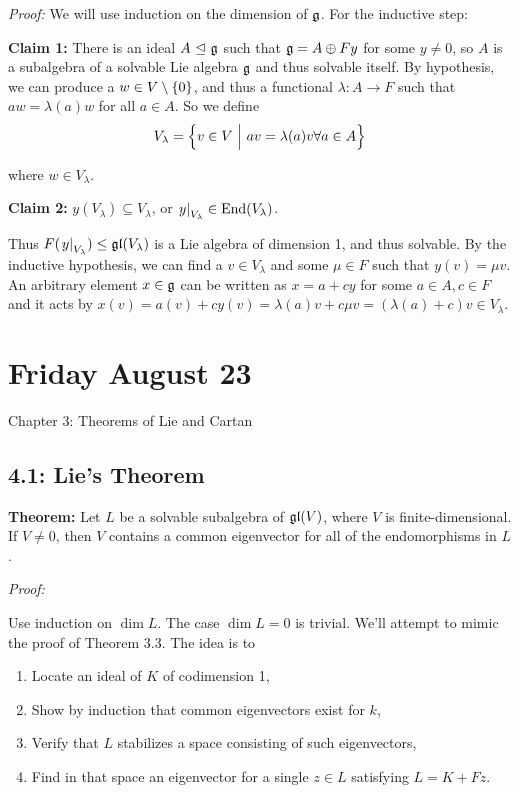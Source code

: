 \emph{Proof:} We will use induction on the dimension of \({\mathfrak{g}}\). For
the inductive step:

\textbf{Claim 1:} There is an ideal \(A{~\trianglelefteq~} {\mathfrak{g}}\) such that
\({\mathfrak{g}} = A \oplus Fy\) for some \(y\neq 0\), so \(A\) is a subalgebra
of a solvable Lie algebra \({\mathfrak{g}}\) and thus solvable itself. By
hypothesis, we can produce a \(w \in V\setminus\left\{{0}\right\}\), and thus a
functional \(\lambda: A \to F\) such that \(aw = \lambda(a) w\) for all
\(a\in A\). So we define \[
V_\lambda = \left\{{v\in V {~\mathrel{\Big|}~} av = \lambda(a)v \forall a\in A}\right\}
\]

where \(w\in V_\lambda\).

\textbf{Claim 2:} \(y(V_\lambda) \subseteq V_\lambda\), or
\({\left.{y}\right|_{V_\lambda}}\in\mathrm{End}(V_\lambda)\).

Thus \(F({\left.{y}\right|_{V_\lambda}}) \leq {\mathfrak{gl}}(V_\lambda)\) is a Lie
algebra of dimension 1, and thus solvable. By the inductive hypothesis,
we can find a \(v\in V_\lambda\) and some \(\mu \in F\) such that
\(y(v) = \mu v\). An arbitrary element \(x\in{\mathfrak{g}}\) can be written as
\(x = a + cy\) for some \(a\in A, c\in F\) and it acts by
\(x(v) = a(v) + cy(v) = \lambda(a) v + c\mu v = (\lambda(a) + c)v \in V_\lambda\).

\hypertarget{friday-august-23}{%
\section{Friday August 23}\label{friday-august-23}}

Chapter 3: Theorems of Lie and Cartan

\hypertarget{lies-theorem}{%
\subsection{4.1: Lie's Theorem}\label{lies-theorem}}

\textbf{Theorem:} Let \(L\) be a solvable subalgebra of \({\mathfrak{gl}}(V)\),
where \(V\) is finite-dimensional. If \(V\neq 0\), then \(V\) contains a
common eigenvector for all of the endomorphisms in \(L\).

\emph{Proof:}

Use induction on \(\dim L\). The case \(\dim L = 0\) is trivial. We'll
attempt to mimic the proof of Theorem 3.3. The idea is to

\begin{enumerate}
\def\labelenumi{\arabic{enumi}.}
\tightlist
\item
  Locate an ideal of \(K\) of codimension 1,
\item
  Show by induction that common eigenvectors exist for \(k\),
\item
  Verify that \(L\) stabilizes a space consisting of such eigenvectors,
\item
  Find in that space an eigenvector for a single \(z \in L\) satisfying
  \(L = K + Fz\).
\end{enumerate}

